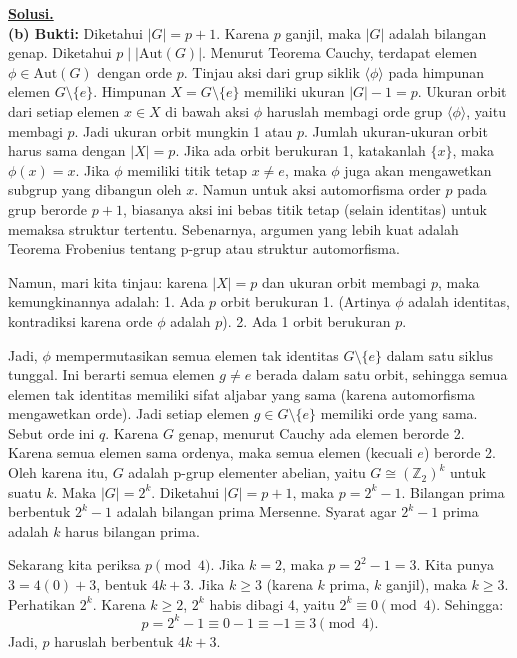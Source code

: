 \documentclass[12pt,twoside]{article}
\newenvironment{solution}
{
	\par\noindent\textbf{\underline{Solusi.}}\\
}
{
	\par
}
\begin{document}
\begin{enumerate}
\begin{solution}
          \textbf{(b) Bukti:}
          Diketahui $|G| = p+1$. Karena $p$ ganjil, maka $|G|$ adalah bilangan genap.
          Diketahui $p \mid |\text{Aut}(G)|$. Menurut Teorema Cauchy, terdapat elemen $\phi \in \text{Aut}(G)$ dengan orde $p$.
          Tinjau aksi dari grup siklik $\langle \phi \rangle$ pada himpunan elemen $G \setminus \{e\}$.
          Himpunan $X = G \setminus \{e\}$ memiliki ukuran $|G| - 1 = p$.
          Ukuran orbit dari setiap elemen $x \in X$ di bawah aksi $\phi$ haruslah membagi orde grup $\langle \phi \rangle$, yaitu membagi $p$.
          Jadi ukuran orbit mungkin 1 atau $p$.
          Jumlah ukuran-ukuran orbit harus sama dengan $|X| = p$.
          Jika ada orbit berukuran 1, katakanlah $\{x\}$, maka $\phi(x) = x$.
          Jika $\phi$ memiliki titik tetap $x \neq e$, maka $\phi$ juga akan mengawetkan subgrup yang dibangun oleh $x$. Namun untuk aksi automorfisma order $p$ pada grup berorde $p+1$, biasanya aksi ini bebas titik tetap (selain identitas) untuk memaksa struktur tertentu.
          Sebenarnya, argumen yang lebih kuat adalah Teorema Frobenius tentang p-grup atau struktur automorfisma.

          Namun, mari kita tinjau: karena $|X|=p$ dan ukuran orbit membagi $p$, maka kemungkinannya adalah:
          1. Ada $p$ orbit berukuran 1. (Artinya $\phi$ adalah identitas, kontradiksi karena orde $\phi$ adalah $p$).
          2. Ada 1 orbit berukuran $p$.

          Jadi, $\phi$ mempermutasikan semua elemen tak identitas $G \setminus \{e\}$ dalam satu siklus tunggal.
          Ini berarti semua elemen $g \neq e$ berada dalam satu orbit, sehingga semua elemen tak identitas memiliki sifat aljabar yang sama (karena automorfisma mengawetkan orde).
          Jadi setiap elemen $g \in G \setminus \{e\}$ memiliki orde yang sama. Sebut orde ini $q$.
          Karena $G$ genap, menurut Cauchy ada elemen berorde 2. Karena semua elemen sama ordenya, maka semua elemen (kecuali $e$) berorde 2.
          Oleh karena itu, $G$ adalah p-grup elementer abelian, yaitu $G \cong (\mathbb{Z}_2)^k$ untuk suatu $k$.
          Maka $|G| = 2^k$.
          Diketahui $|G| = p+1$, maka $p = 2^k - 1$.
          Bilangan prima berbentuk $2^k - 1$ adalah bilangan prima Mersenne.
          Syarat agar $2^k-1$ prima adalah $k$ harus bilangan prima.

          Sekarang kita periksa $p \pmod 4$.
          Jika $k=2$, maka $p = 2^2 - 1 = 3$. Kita punya $3 = 4(0) + 3$, bentuk $4k+3$.
          Jika $k \ge 3$ (karena $k$ prima, $k$ ganjil), maka $k \ge 3$.
          Perhatikan $2^k$. Karena $k \ge 2$, $2^k$ habis dibagi 4, yaitu $2^k \equiv 0 \pmod 4$.
          Sehingga:
          \[ p = 2^k - 1 \equiv 0 - 1 \equiv -1 \equiv 3 \pmod 4. \]
          Jadi, $p$ haruslah berbentuk $4k+3$.
        \end{solution}
\end{enumerate}
\end{document}
